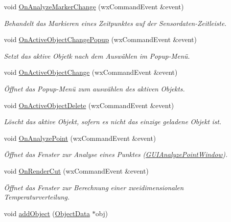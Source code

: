 \begin{DoxyCompactItemize}
void \hyperlink{classGUIMainWindow_a3a01e75c9362861eb9fdacb0b27643e5}{On\-Analyze\-Marker\-Change} (wx\-Command\-Event \&event)
\begin{DoxyCompactList}\small\item\em Behandelt das Markieren eines Zeitpunktes auf der Sensordaten-\/\-Zeitleiste. \end{DoxyCompactList}\item 
void \hyperlink{classGUIMainWindow_a868b65c50e42965818ceb61a5e84f687}{On\-Active\-Object\-Change\-Popup} (wx\-Command\-Event \&event)
\begin{DoxyCompactList}\small\item\em Setzt das aktive Objetk nach dem Auswählen im Popup-\/\-Menü. \end{DoxyCompactList}\item 
void \hyperlink{classGUIMainWindow_a62a20086c62508c133a2ac8a0496e543}{On\-Active\-Object\-Change} (wx\-Command\-Event \&event)
\begin{DoxyCompactList}\small\item\em Öffnet das Popup-\/\-Menü zum auswählen des aktiven Objekts. \end{DoxyCompactList}\item 
void \hyperlink{classGUIMainWindow_a1bc00767853df9d7b839529ce722fcb1}{On\-Active\-Object\-Delete} (wx\-Command\-Event \&event)
\begin{DoxyCompactList}\small\item\em Löscht das aktive Objekt, sofern es nicht das einzige geladene Objekt ist. \end{DoxyCompactList}\item 
void \hyperlink{classGUIMainWindow_a5e4e41a749453fae5d9e1714203c3d5f}{On\-Analyze\-Point} (wx\-Command\-Event \&event)
\begin{DoxyCompactList}\small\item\em Öffnet das Fenster zur Analyse eines Punktes (\hyperlink{classGUIAnalyzePointWindow}{G\-U\-I\-Analyze\-Point\-Window}). \end{DoxyCompactList}\item 
void \hyperlink{classGUIMainWindow_a08089b067f803799204bbc1ca81230ac}{On\-Render\-Cut} (wx\-Command\-Event \&event)
\begin{DoxyCompactList}\small\item\em Öffnet das Fenster zur Berechnung einer zweidimensionalen Temperaturverteilung. \end{DoxyCompactList}\item 
void \hyperlink{classGUIMainWindow_abaec210619095a00227277b8e0434a8d}{add\-Object} (\hyperlink{classObjectData}{Object\-Data} $\ast$obj)

\end{DoxyCompactItemize}
